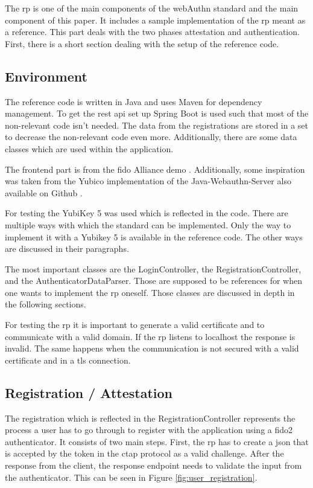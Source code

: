 \documentclass[a4paper, 11pt]{scrartcl}
\begin{document}
The \gls{rp} is one of the main components of the \gls{webAuthn} standard and the main component of this paper. It includes a sample implementation of the \gls{rp} meant as a reference. This part deals with the two phases attestation and authentication. First, there is a short section dealing with the setup of the reference code.

\subsection{Environment}

The reference code is written in Java and uses Maven for dependency management. To get the \gls{rest} \gls{api} set up Spring Boot is used such that most of the non-relevant code isn't needed. The data from the registrations are stored in a set to decrease the non-relevant code even more. Additionally, there are some data classes which are used within the application.

The frontend part is from the \gls{fido} Alliance demo \cite{fido:demo}. Additionally, some inspiration was taken from the Yubico implementation of the Java-Webauthn-Server also available on Github \cite{yubico:webauthn:server}. 

For testing the YubiKey 5 was used \cite{yubico:yubikey5} which is reflected in the code. There are multiple ways with which the standard can be implemented. Only the way to implement it with a Yubikey 5 is available in the reference code. The other ways are discussed in their paragraphs.

The most important classes are the LoginController, the RegistrationController, and the AuthenticatorDataParser. Those are supposed to be references for when one wants to implement the \gls{rp} oneself. Those classes are discussed in depth in the following sections.

For testing the \gls{rp} it is important to generate a valid certificate and to communicate with a valid domain. If the \gls{rp} listens to localhost the response is invalid. The same happens when the communication is not secured with a valid certificate and in a \gls{tls} connection.

\clearpage

\subsection{Registration / Attestation}

The registration which is reflected in the RegistrationController represents the process a user has to go through to register with the application using a \gls{fido2} authenticator. It consists of two main steps. First, the \gls{rp} has to create a \gls{json} that is accepted by the token in the \gls{ctap} protocol as a valid challenge. After the response from the client, the response endpoint needs to validate the input from the authenticator. This can be seen in Figure \ref{fig:user_registration}.
\end{document}
